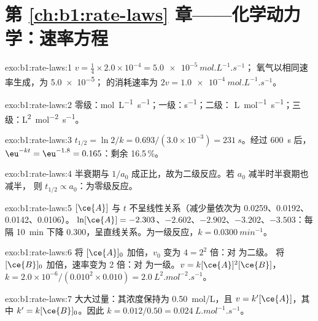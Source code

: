 \section*{第 \ref{ch:b1:rate-laws} 章——化学动力学：速率方程}

\begin{solution}{exo:b1:rate-laws:1}
$v = \frac14 \times 2.0 \times 10^{-4} = \qty{5.0e-5}{mol.L^{-1}.s^{-1}}$；
氧气以相同速率生成，为 \qty{5.0e-5}{}； 的消耗速率为
$2v = \qty{1.0e-4}{mol.L^{-1}.s^{-1}}$。
\end{solution}

\begin{solution}{exo:b1:rate-laws:2}
零级：\unit{mol.L^{-1}.s^{-1}}；一级：\unit{s^{-1}}；二级：
\unit{L.mol^{-1}.s^{-1}}；三级：\unit{L^2.mol^{-2}.s^{-1}}。
\end{solution}

\begin{solution}{exo:b1:rate-laws:3}
$t_{1/2} = \ln2/k = 0.693/(3.0 \times 10^{-3}) = \qty{231}{s}$。经过
\qty{600}{s} 后，$\eu^{-kt} = \eu^{-1.8} = 0.165$：剩余 16.5\,\%。
\end{solution}

\begin{solution}{exo:b1:rate-laws:4}
半衰期与 $1/a_0$ 成正比，故为二级反应。若 $a_0$ 减半时半衰期也减半，
则 $t_{1/2} \propto a_0$：为零级反应。
\end{solution}

\begin{solution}{exo:b1:rate-laws:5}
$[\ce{A}]$ 与 $t$ 不呈线性关系（减少量依次为 0.0259、0.0192、0.0142、0.0106）。
$\ln[\ce{A}] = -2.303$、$-2.602$、$-2.902$、$-3.202$、$-3.503$：每隔
\qty{10}{min} 下降 0.300，呈直线关系。为一级反应，$k =
\qty{0.0300}{min^{-1}}$。
\end{solution}

\begin{solution}{exo:b1:rate-laws:6}
将 $[\ce{A}]_0$ 加倍，$v_0$ 变为 $4 = 2^2$ 倍：对  为二级。
将 $[\ce{B}]_0$ 加倍，速率变为 2 倍：对  为一级。$v =
k[\ce{A}]^2[\ce{B}]$，$k = 2.0 \times 10^{-6}/(0.010^2 \times 0.010) =
\qty{2.0}{L^2.mol^{-2}.s^{-1}}$。
\end{solution}

\begin{solution}{exo:b1:rate-laws:7}
 大大过量：其浓度保持为
\qty{0.50}{mol/L}，且 $v = k'[\ce{A}]$，其中 $k' = k[\ce{B}]_0$。因此
$k = 0.012/0.50 = \qty{0.024}{L.mol^{-1}.s^{-1}}$。
\end{solution}

